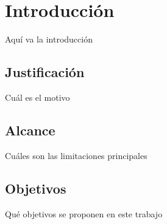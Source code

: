 \chapter{Introducción}
Aquí va la introducción

\section{Justificación}
Cuál es el motivo

\section{Alcance}
Cuáles son las limitaciones principales

\section{Objetivos}
Qué objetivos se proponen en este trabajo
